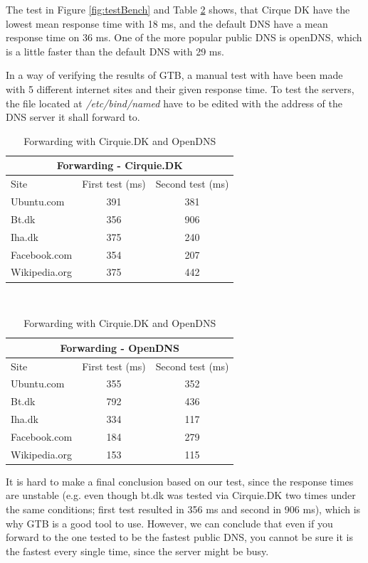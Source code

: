 \documentclass[Main]{subfiles}
\begin{document}
The test in Figure \ref{fig:testBench} and Table \ref{tab:Forwarding} shows, that Cirque DK have the lowest mean response time with 18 ms, and the default DNS have a mean response time on 36 ms. 
One of the more popular public DNS is openDNS, which is a little faster than the default DNS with 29 ms. 

In a way of verifying the results of GTB, a manual test with  have been made with 5 different internet sites and their given response time. 
To test the servers, the file located at \textit{/etc/bind/named} have to be edited with the address of the DNS server it shall forward to. 

\begin{table}[H]

\begin{center}
  \begin{tabular}{l|c|c}
    \multicolumn{3}{c}{Forwarding - Cirquie.DK}  \\
	\hline Site & First test (ms) & Second test (ms) \\ \hline
    Ubuntu.com & 391 & 381  \\ %
    Bt.dk & 356 & 906  \\ %
	Iha.dk & 375 & 240 \\ %
	Facebook.com & 354 &	207 \\ %
	Wikipedia.org & 375 & 442 \\ \hline
  \end{tabular}
\end{center}
~\\
\begin{center}
  \begin{tabular}{l|c|c}
    \multicolumn{3}{c}{Forwarding - OpenDNS}  \\
	\hline Site & First test (ms) & Second test (ms) \\     
    \hline
    Ubuntu.com & 355 & 352  \\ %
    Bt.dk & 792 & 436  \\ %
	Iha.dk & 334 & 117 \\ %
	Facebook.com & 184 & 279 \\ %
	Wikipedia.org & 153 & 115 \\ \hline
  \end{tabular}
\end{center}
\caption{Forwarding with Cirquie.DK and OpenDNS}
\label{tab:Forwarding}
\end{table}


It is hard to make a final conclusion based on our test, since the response times are unstable (e.g. even though bt.dk was tested via Cirquie.DK two times under the same conditions; first test resulted in 356 ms and second in 906 ms), which is why GTB is a good tool to use. 
However, we can conclude that even if you forward to the one tested to be the fastest public DNS, you cannot be sure it is the fastest every single time, since the server might be busy.
\end{document}
